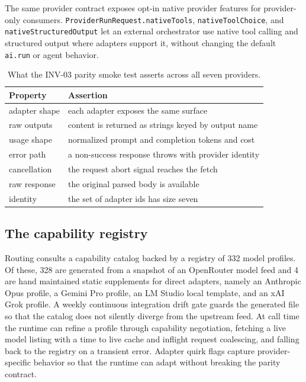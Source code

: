 \documentclass[conference]{IEEEtran}
\newcommand{\code}[1]{\texttt{\small #1}}
\begin{document}
The same provider contract exposes opt-in native provider features for provider-only
consumers. \code{ProviderRunRequest.nativeTools}, \code{nativeToolChoice}, and
\code{nativeStructuredOutput} let an external orchestrator use native tool calling
and structured output where adapters support it, without changing the default
\code{ai.run} or agent behavior.

\begin{table}[t]
\centering
\caption{What the INV-03 parity smoke test asserts across all seven providers.}
\label{tab:parity}
\footnotesize
\begin{tabular}{@{}p{} p{}@{}}
\toprule
Property & Assertion \\
\midrule
adapter shape & each adapter exposes the same surface \\
raw outputs & content is returned as strings keyed by output name \\
usage shape & normalized prompt and completion tokens and cost \\
error path & a non-success response throws with provider identity \\
cancellation & the request abort signal reaches the fetch \\
raw response & the original parsed body is available \\
identity & the set of adapter ids has size seven \\
\bottomrule
\end{tabular}
\end{table}

\subsection{The capability registry}

Routing consults a capability catalog backed by a registry of 332 model profiles. Of
these, 328 are generated from a snapshot of an OpenRouter model feed and 4 are hand
maintained static supplements for direct adapters, namely an Anthropic Opus profile, a
Gemini Pro profile, an LM Studio local template, and an xAI Grok profile. A weekly
continuous integration drift gate guards the generated file so that the catalog does
not silently diverge from the upstream feed. At call time the runtime can refine a
profile through capability negotiation, fetching a live model listing with a time to
live cache and inflight request coalescing, and falling back to the registry on a
transient error. Adapter quirk flags capture provider-specific behavior so that the
runtime can adapt without breaking the parity contract.
\end{document}
